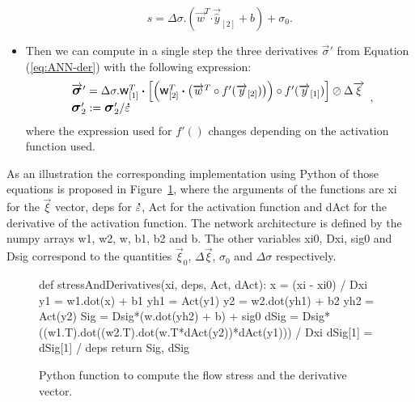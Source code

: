 \documentclass[algorithms,article,submit,pdftex,oneauthors]{Definitions/mdpi}
\DeclareRobustCommand{\w}{\mbox{\large\ensuremath{\mathsf{w}}}}
\DeclareRobustCommand{\dotp}{\boldsymbol{\cdot}}
\DeclareRobustCommand{\lay}[1]{_{[#1]}}
\DeclareRobustCommand{\mdot}[1]{\accentset{\mbox{\bfseries .}}{#1}}
\DeclareRobustCommand{\Sig}{\mbox{\large\ensuremath{\boldsymbol{\sigma}}}}
\DeclareRobustCommand{\var}[1]{\textsf{#1}}
\begin{document}
\begin{itemize}
\begin{equation}
s = \Delta\sigma.\left(\overrightarrow{w}^T \dotp \overrightarrow{\hat{y}}\lay{2} + b\right) + \sigma_{0}.
\end{equation}
\item Then we can compute in a single step the three derivatives $\overrightarrow{\sigma}'$ from Equation (\ref{eq:ANN-der}) with the following expression:
\begin{equation}
\begin{array}{l}
\overrightarrow{\Sig}' = \Delta\sigma.\w\lay{1}^T \dotp\left[\left(\w\lay{2}^T \dotp \left(\overrightarrow{w}^T \circ f'(\overrightarrow{y}\lay{2})\right)\right) \circ f'(\overrightarrow{y}\lay{1})\right] \oslash \Delta\overrightarrow{\xi}\\
\Sig_2' := \Sig_2' / \mdot{\varepsilon}
\end{array},
\end{equation}
where the expression used for $f'()$ changes depending on the activation function used.
\end{itemize}
As an illustration the corresponding implementation using Python of those equations is proposed in Figure~\ref{fig:PythonStress}, where the arguments of the functions are \var{xi} for the $\overrightarrow{\xi}$ vector, \var{deps} for $\mdot{\varepsilon}$, \var{Act} for the activation function and \var{dAct} for the derivative of the activation function.
The network architecture is defined by the numpy arrays \var{w1}, \var{w2}, \var{w}, \var{b1}, \var{b2} and \var{b}.
The other variables \var{xi0}, \var{Dxi}, \var{sig0} and \var{Dsig} correspond to the quantities $\overrightarrow{\xi}_{0}$, $\Delta\overrightarrow{\xi}$, $\sigma_{0}$ and $\Delta\sigma$ respectively.
\begin{figure}[h!]
\begin{PythonListing}
def stressAndDerivatives(xi, deps, Act, dAct):
  x = (xi - xi0) / Dxi
  y1 = w1.dot(x) + b1
  yh1 = Act(y1)
  y2 = w2.dot(yh1) + b2
  yh2 = Act(y2)
  Sig = Dsig*(w.dot(yh2) + b) + sig0
  dSig = Dsig*((w1.T).dot((w2.T).dot(w.T*dAct(y2))*dAct(y1))) / Dxi
  dSig[1] = dSig[1] / deps
  return Sig, dSig
\end{PythonListing}
\caption{Python function to compute the flow stress and the derivative vector.\label{fig:PythonStress}}
\end{figure}
\end{document}
